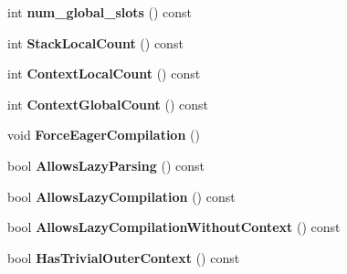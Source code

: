 \begin{DoxyCompactItemize}
\item 
int {\bfseries num\+\_\+global\+\_\+slots} () const \hypertarget{classv8_1_1internal_1_1_scope_a26da88b0758521e201ab256d33944591}{}\label{classv8_1_1internal_1_1_scope_a26da88b0758521e201ab256d33944591}

\item 
int {\bfseries Stack\+Local\+Count} () const \hypertarget{classv8_1_1internal_1_1_scope_a87178b7d3605282589cf613a417ebebf}{}\label{classv8_1_1internal_1_1_scope_a87178b7d3605282589cf613a417ebebf}

\item 
int {\bfseries Context\+Local\+Count} () const \hypertarget{classv8_1_1internal_1_1_scope_a035a505d7381a7973a1fa58e6e615eb1}{}\label{classv8_1_1internal_1_1_scope_a035a505d7381a7973a1fa58e6e615eb1}

\item 
int {\bfseries Context\+Global\+Count} () const \hypertarget{classv8_1_1internal_1_1_scope_aedb37e379028bfda1713587c1dd958ad}{}\label{classv8_1_1internal_1_1_scope_aedb37e379028bfda1713587c1dd958ad}

\item 
void {\bfseries Force\+Eager\+Compilation} ()\hypertarget{classv8_1_1internal_1_1_scope_a609251b5a5e8fd6762298a9c282c9c77}{}\label{classv8_1_1internal_1_1_scope_a609251b5a5e8fd6762298a9c282c9c77}

\item 
bool {\bfseries Allows\+Lazy\+Parsing} () const \hypertarget{classv8_1_1internal_1_1_scope_a2524b641eea072a81d988738869dce18}{}\label{classv8_1_1internal_1_1_scope_a2524b641eea072a81d988738869dce18}

\item 
bool {\bfseries Allows\+Lazy\+Compilation} () const \hypertarget{classv8_1_1internal_1_1_scope_a4d0aa05a7281a6445cf5b3f6685222ce}{}\label{classv8_1_1internal_1_1_scope_a4d0aa05a7281a6445cf5b3f6685222ce}

\item 
bool {\bfseries Allows\+Lazy\+Compilation\+Without\+Context} () const \hypertarget{classv8_1_1internal_1_1_scope_a26b0d5a2fa5d22c3822aaee0b6eacf16}{}\label{classv8_1_1internal_1_1_scope_a26b0d5a2fa5d22c3822aaee0b6eacf16}

\item 
bool {\bfseries Has\+Trivial\+Outer\+Context} () const \hypertarget{classv8_1_1internal_1_1_scope_a013580c95b228155f384966c8efe32db}{}\label{classv8_1_1internal_1_1_scope_a013580c95b228155f384966c8efe32db}


\end{DoxyCompactItemize}
